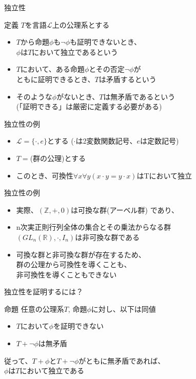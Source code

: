 \documentclass[17pt,aspectratio=169,xcolor=dvipsnames,table,dvipdfmx]{beamer}
\theoremstyle{definition}
\begin{document}
\begin{frame} {独立性}
    \begin{block}{定義}
        $T$を言語$\mathcal{L}$上の公理系とする
        \begin{itemize}
            \item $T$から命題$\phi$も$\neg \phi$も証明できないとき、\\ $\phi$は$T$において独立であるという
            \item $T$において、ある命題$\phi$とその否定$\neg \phi$が\\ともに証明できるとき、$T$は矛盾するという
            \item そのような$\phi$がないとき、$T$は無矛盾であるという \\ {\footnotesize (「証明できる」は厳密に定義する必要がある)}
        \end{itemize}
    \end{block}

\end{frame}

\begin{frame} {独立性の例}
    \begin{itemize}
        \item $\mathcal{L} = \{ \cdot, e \}$とする {\small ($\cdot$は2変数関数記号、$e$は定数記号)}
        \item $T = $(群の公理)とする
        \item このとき、可換性$\forall x \forall y (x\cdot y = y \cdot x)$はTにおいて独立
    \end{itemize}
\end{frame}

\begin{frame} {独立性の例}
    \begin{itemize}
        \item 実際、$(\mathbb{Z}, +, 0)$は可換な群{\small (アーベル群) }であり、
        \item n次実正則行列全体の集合とその乗法からなる群 \\$(GL_n(\mathbb{R}), \cdot, I_n)$は非可換な群である
        \item 可換な群と非可換な群が存在するため、\\群の公理から可換性を導くことも、\\非可換性を導くこともできない
    \end{itemize}
\end{frame}

\begin{frame} {独立性を証明するには？}
    \begin{exampleblock}{命題}
        任意の公理系$T$, 命題$\phi$に対し、以下は同値
        \begin{itemize}
            \item $T$において$\phi$を証明できない
            \item $T + \neg \phi$は無矛盾
        \end{itemize}
    \end{exampleblock}
    従って、$T + \phi$と$T + \neg \phi$がともに無矛盾であれば、\\$\phi$は$T$において独立である
\end{frame}
\end{document}
